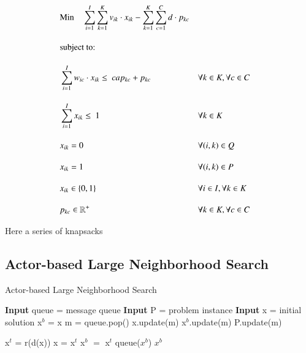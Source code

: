 \documentclass[preprint,12pt,authoryear]{elsarticle}
\begin{document}
\begin{alignat}{2}
	& \text{Min} \quad \sum_{i = 1}^{I} \sum_{k = 1}^{K} v_{ik} \cdot x_{ik} - \sum_{k = 1}^{K} \sum_{c = 1}^C d \cdot p_{kc} \label{eqn:objective_function_strategic} \\[1em]
    & \text{subject to:} \notag                                                                                                                                         \\[1em]
	& \sum_{i=1}^I w_{ic} \cdot x_{ik} \leq \ cap_{kc} + p_{kc}        && \forall k \in K, \forall c \in C         \label{eqn:capacity_constraint}          \\[1em]
	& \sum_{i = 1}^{I} x_{ik} \leq \ 1                               && \forall k \in K                                \label{eqn:single_workorder_constraint}  \\[1em]
	& x_{ik} = 0                                                     && \forall (i, k) \in Q                                  \label{eqn:exclusion_constraint}         \\[1em]
	& x_{ik} = 1                                                     && \forall (i, k) \in P                                  \label{eqn:inclusion_constraint}                                                                                                \\[1em]
	& x_{ik} \in \{0, 1\}                                            && \forall i \in I, \forall k \in K        \label{eqn:x_integrality_constraint}     \\[1em] 
	& p_{kc} \in \mathbb{R}^{+}                                      && \forall k \in K, \forall c \in C        \label{eqn:p_non_negativity_constraint}
\end{alignat}

Here a series of knapsacks 

\subsection{Actor-based Large Neighborhood Search}
\begin{algorithm}[H]
\caption{Actor-based Large Neighborhood Search}  \label{algo1}
\begin{algorithmic}[1]
\State \textbf{Input} queue = message queue
\State \textbf{Input} P     = problem instance
\State \textbf{Input} x     = initial solution
\State x$^b$ = x 
\Repeat
        \State m = queue.pop()
        \State x.update(m)
        \State x$^b$.update(m)
		\State P.update(m)
    \EndIf
	
    \State x$^t$ = r(d(x))
                           \label{alg:acceptance_criteria_start}
        \State x = x$^t$
    \EndIf                                       \label{alg:acceptance_criteria_end}
       \label{alg:objective_start}
        \State x$^b$ $=$ x$^t$
		\State queue($x^b$)
    \EndIf                                       \label{alg:objective_end}
\EndRepeat
\Return $x^b$
\end{algorithmic}
\end{algorithm}
\end{document}
